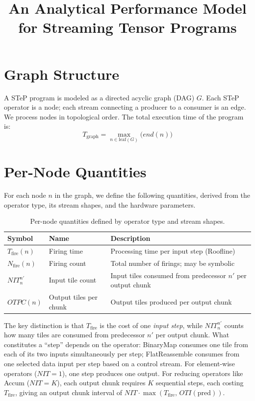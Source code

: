 \documentclass[10pt]{article}
\title{An Analytical Performance Model for Streaming Tensor Programs}
\author{}
\date{}
\begin{document}
\maketitle

\section{Graph Structure}

A STeP program is modeled as a directed acyclic graph (DAG) $G$. Each STeP operator is a node; each stream connecting a producer to a consumer is an edge. We process nodes in topological order. The total execution time of the program is:
\begin{equation}
    T_{\text{graph}} = \max_{n \in \text{leaf}(G)} \bigl(\textit{end}(n)\bigr)
\end{equation}

\section{Per-Node Quantities}

For each node $n$ in the graph, we define the following quantities, derived from the operator type, its stream shapes, and the hardware parameters.

\begin{table}[h]
\centering
\begin{tabular}{@{}lll@{}}
\toprule
\textbf{Symbol} & \textbf{Name} & \textbf{Description} \\
\midrule
$T_{\text{fire}}(n)$ & Firing time & Processing time per input step (Roofline) \\
$N_{\text{fire}}(n)$ & Firing count & Total number of firings; may be symbolic \\
$\mathit{NIT}^{n'}_n$ & Input tile count & Input tiles consumed from predecessor $n'$ per output chunk \\
$\mathit{OTPC}(n)$ & Output tiles per chunk & Output tiles produced per output chunk \\
\bottomrule
\end{tabular}
\caption{Per-node quantities defined by operator type and stream shapes.}
\label{tab:node-info}
\end{table}

The key distinction is that $T_{\text{fire}}$ is the cost of one \emph{input step}, while $\mathit{NIT}^{n'}_n$ counts how many tiles are consumed from predecessor $n'$ per output chunk. What constitutes a ``step'' depends on the operator: BinaryMap consumes one tile from each of its two inputs simultaneously per step; FlatReassemble consumes from one selected data input per step based on a control stream. For element-wise operators ($\mathit{NIT} = 1$), one step produces one output. For reducing operators like Accum ($\mathit{NIT} = K$), each output chunk requires $K$ sequential steps, each costing $T_{\text{fire}}$, giving an output chunk interval of $\mathit{NIT} \cdot \max(T_{\text{fire}},\, \mathit{OTI}(\text{pred}))$.
\end{document}
